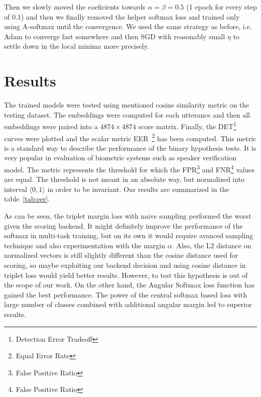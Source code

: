 \medskip
\noindent
Then we slowly moved the coeficients towards $ \alpha = \beta = 0.5 $ (1 epoch for every step of $ 0.1 $) and then we finally removed the helper softmax loss and trained only using A-softmax until the convergence. We used the same strategy as before, i.e. Adam to converge fast somewhere and then SGD with reasonably small $ \eta $ to settle down in the local minima more precisely.

\section{Results}

The trained models were tested using mentioned cosine similarity metric on the testing dataset. The embeddings were computed for each utterance and then all embeddings were paired into a $ 4874 \times 4874 $ score matrix. Finally, the DET\footnote{Detection Error Tradeoff} curves were plotted and the scalar metric EER~\footnote{Equal Error Rate} has been computed. This metric is a standard way to describe the performance of the binary hypothesis tests. It is very popular in evaluation of biometric systems such as speaker verification model. The metric represents the threshold for which the FPR\footnote{False Positive Ratio} and FNR\footnote{False Positive Ratio} values are equal. The threshold is not meant in an absolute way, but normalized into interval $ \langle 0, 1 \rangle $ in order to be invariant. Our results are summarized in the table~\ref{tab:eer}.



\medskip
\noindent
As can be seen, the triplet margin loss with naive sampling performed the worst given the scoring backend. It might definitely improve the performance of the softmax in multi-task training, but on its own it would require avanced sampling technique and also experimentation with the margin $ \alpha $. Also, the L2 distance on normalized vectors is still slightly different than the cosine distance used for scoring, so maybe exploiting our backend decision and using cosine distance in triplet loss would yield better results. However, to test this hypothesis is out of the scope of our work. On the other hand, the Angular Softmax loss function has gained the best performance. The power of the central softmax based loss with large number of classes combined with additional angular margin led to superior results.

